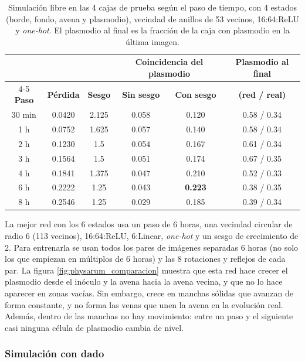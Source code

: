 \begin{table}[htbp]
	\centering
	\footnotesize
	\begin{tabular}{@{}cccccc@{}}
		\toprule
		& & & \multicolumn{2}{c}{\textbf{Coincidencia del plasmodio}} & \textbf{Plasmodio al final} \\
		\cmidrule(lr){4-5}
		\textbf{Paso} & \textbf{Pérdida} & \textbf{Sesgo} & \textbf{Sin sesgo} & \textbf{Con sesgo} & \textbf{(red / real)} \\ \midrule
		30 min & 0.0420 & 2.125 & 0.058 & 0.120 & 0.58 / 0.34 \\
		1 h & 0.0752 & 1.625 & 0.057 & 0.140 & 0.58 / 0.34 \\
		2 h & 0.1230 & 1.5 & 0.054 & 0.167 & 0.61 / 0.34 \\
		3 h & 0.1564 & 1.5 & 0.051 & 0.174 & 0.67 / 0.35 \\
		4 h & 0.1841 & 1.375 & 0.047 & 0.210 & 0.52 / 0.33 \\
		6 h & 0.2222 & 1.25 & 0.043 & \textbf{0.223} & 0.38 / 0.35 \\
		8 h & 0.2546 & 1.25 & 0.029 & 0.185 & 0.39 / 0.34 \\
		\bottomrule
	\end{tabular}
	\caption{Simulación libre en las 4 cajas de prueba según el paso de tiempo, con 4 estados (borde, fondo, avena y plasmodio), vecindad de anillos de 53 vecinos, 16:64:ReLU y \textit{one-hot}. El plasmodio al final es la fracción de la caja con plasmodio en la última imagen.}
	\label{tab:physarum_paso}
\end{table}

La mejor red con los 6 estados usa un paso de 6 horas, una vecindad circular de radio 6 (113 vecinos), 16:64:ReLU, 6:Linear, \textit{one-hot} y un sesgo de crecimiento de 2. Para entrenarla se usan todos los pares de imágenes separadas 6 horas (no solo los que empiezan en múltiplos de 6 horas) y las 8 rotaciones y reflejos de cada par. La figura \ref{fig:physarum_comparacion} muestra que esta red hace crecer el plasmodio desde el inóculo y la avena hacia la avena vecina, y que no lo hace aparecer en zonas vacías. Sin embargo, crece en manchas sólidas que avanzan de forma constante, y no forma las venas que unen la avena en la evolución real. Además, dentro de las manchas no hay movimiento: entre un paso y el siguiente casi ninguna célula de plasmodio cambia de nivel.

\subsubsection{Simulación con dado}

